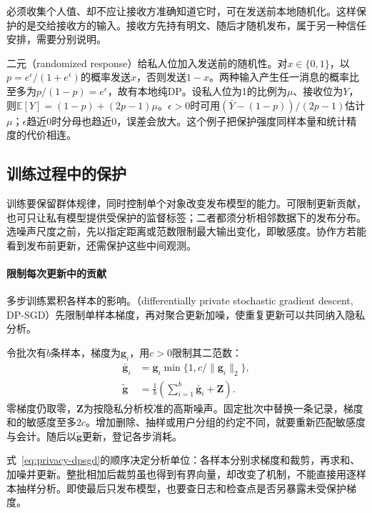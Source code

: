 必须收集个人值、却不应让接收方准确知道它时，可在发送前本地随机化。这样保护的是交给接收方的输入。接收方先持有明文、随后才随机发布，属于另一种信任安排，需要分别说明。

二元（randomized response）给私人位加入发送前的随机性。对$x\in\{0,1\}$，以$p=e^\epsilon/(1+e^\epsilon)$的概率发送$x$，否则发送$1-x$。两种输入产生任一消息的概率比至多为$p/(1-p)=e^\epsilon$，故有本地纯DP。设私人位为1的比例为$\mu$、接收位为$Y$，则$\mathbb E[Y]=(1-p)+(2p-1)\mu$。$\epsilon>0$时可用$(\bar Y-(1-p))/(2p-1)$估计$\mu$；$\epsilon$趋近0时分母也趋近0，误差会放大。这个例子把保护强度同样本量和统计精度的代价相连。

\subsection{训练过程中的保护}
\label{sec:privacy-training-influence}

训练要保留群体规律，同时控制单个对象改变发布模型的能力。可限制更新贡献，也可只让私有模型提供受保护的监督标签；二者都须分析相邻数据下的发布分布。选噪声尺度之前，先以指定距离或范数限制最大输出变化，即敏感度。协作方若能看到发布前更新，还需保护这些中间观测。

\paragraph{限制每次更新中的贡献}

多步训练累积各样本的影响。（differentially private stochastic gradient descent, DP-SGD）先限制单样本梯度，再对聚合更新加噪，使重复更新可以共同纳入隐私分析。

令批次有$b$条样本，梯度为$\bm g_i$，用$c>0$限制其二范数：
\begin{equation}
 \begin{aligned}
 \bar{\bm g}_i
 &=\bm g_i\min\{1,c/\lVert\bm g_i\rVert_2\},\\
 \tilde{\bm g}
 &=\frac{1}{b}\left(\sum_{i=1}^{b}\bar{\bm g}_i+\bm Z\right).
 \end{aligned}
 \label{eq:privacy-dpsgd}
\end{equation}
零梯度仍取零，$\bm Z$为按隐私分析校准的高斯噪声。固定批次中替换一条记录，梯度和的敏感度至多$2c$。增加删除、抽样或用户分组的约定不同，就要重新匹配敏感度与会计。随后以$\tilde{\bm g}$更新，登记各步消耗。

式~\eqref{eq:privacy-dpsgd}的顺序决定分析单位：各样本分别求梯度和裁剪，再求和、加噪并更新。整批相加后裁剪虽也得到有界向量，却改变了机制，不能直接用逐样本抽样分析。即使最后只发布模型，也要查日志和检查点是否另暴露未受保护梯度。

